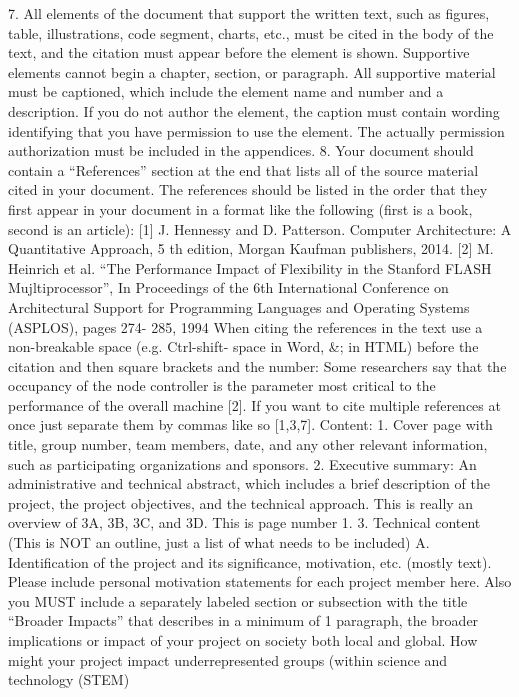 \documentclass[a4paper,10pt]{article}
\begin{document}
7. All elements of the document that support the written text, such as figures, table,
illustrations, code segment, charts, etc., must be cited in the body of the text, and
the citation must appear before the element is shown. Supportive elements cannot
begin a chapter, section, or paragraph. All supportive material must be captioned,
which include the element name and number and a description. If you do not author
the element, the caption must contain wording identifying that you have permission
to use the element. The actually permission authorization must be included in the
appendices.
8. Your document should contain a “References” section at the end that lists all of
the source material cited in your document. The references should be listed in the
order that they first appear in your document in a format like the following (first is a
book, second is an article):
[1] J. Hennessy and D. Patterson. Computer Architecture: A Quantitative Approach,
5 th edition, Morgan Kaufman publishers, 2014.
[2] M. Heinrich et al. “The Performance Impact of Flexibility in the Stanford FLASH
Mujltiprocessor”, In Proceedings of the 6th International Conference on Architectural
Support for Programming Languages and Operating Systems (ASPLOS), pages 274-
285, 1994
When citing the references in the text use a non-breakable space (e.g. Ctrl-shift-
space in Word, \&; in HTML) before the citation and then square brackets and
the number:
Some researchers say that the occupancy of the node controller is the
parameter most critical to the performance of the overall machine [2].
If you want to cite multiple references at once just separate them by commas like
so [1,3,7].
Content:
1. Cover page with title, group number, team members, date, and any other relevant
information, such as participating organizations and sponsors.
2. Executive summary: An administrative and technical abstract, which includes a
brief description of the project, the project objectives, and the technical approach.
This is really an overview of 3A, 3B, 3C, and 3D. This is page number 1.
3. Technical content (This is NOT an outline, just a list of what needs to be included)
A. Identification of the project and its significance, motivation, etc. (mostly
text). Please include personal motivation statements for each project member here.
Also you MUST include a separately labeled section or subsection with the title
“Broader Impacts” that describes in a minimum of 1 paragraph, the broader
implications or impact of your project on society both local and global. How might
your project impact underrepresented groups (within science and technology (STEM)
\end{document}
